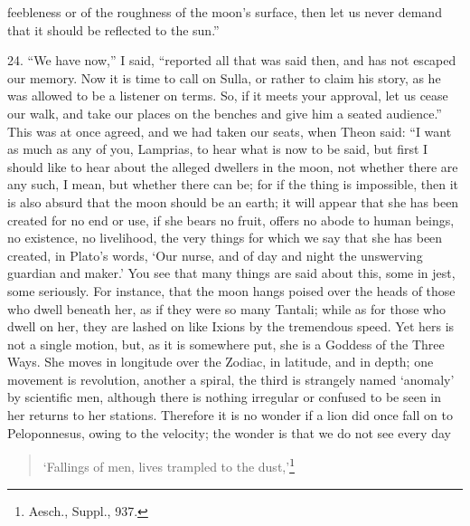 \documentclass[a4paper, 11pt, oneside, polutonikogreek, english]{article}
\begin{document}
feebleness or of the roughness of the moon's surface, then let us never demand that it should be reflected to the sun.''

24. ``We have now,'' I said, ``reported all that was said then, and has not escaped our memory. Now it is time to call on Sulla, or rather to claim his story, as he was allowed to be a listener on terms. So, if it meets your approval, let us cease our walk, and take our places on the benches and give him a seated audience.'' This was at once agreed, and we had taken our seats, when Theon said: ``I want as much as any of you, Lamprias, to hear what is now to be said, but first I should like to hear about the alleged dwellers in the moon, not whether there are any such, I mean, but whether there can be; for if the thing is impossible, then it is also absurd that the moon should be an earth; it will appear that she has been created for no end or use, if she bears no fruit, offers no abode to human beings, no existence, no livelihood, the very things for which we say that she has been created, in Plato's words, `Our nurse, and of day and night the unswerving guardian and maker.' You see that many things are said about this, some in jest, some seriously. For instance, that the moon hangs poised over the heads of those who dwell beneath her, as if they were so many Tantali; while as for those who dwell on her, they are lashed on like Ixions by the tremendous speed. Yet hers is not a single motion, but, as it is somewhere put, she is a Goddess of the Three Ways. She moves in longitude over the Zodiac, in latitude, and in depth; one movement is revolution, another a spiral, the third is strangely named `anomaly' by scientific men, although there is nothing irregular or confused to be seen in her returns to her stations. Therefore it is no wonder if a lion did once fall on to Peloponnesus, owing to the velocity; the wonder is that we do not see every day
\begin{quotation}
`Fallings of men, lives trampled to the dust,'\footnote{Aesch., Suppl., 937.}
\end{quotation}
\end{document}

